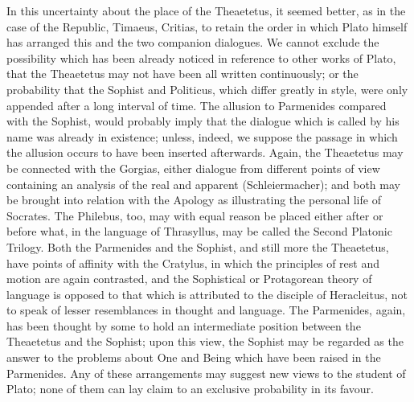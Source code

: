 \documentclass[11pt,letter]{article}
\begin{document}
\par  In this uncertainty about the place of the Theaetetus, it seemed better, as in the case of the Republic, Timaeus, Critias, to retain the order in which Plato himself has arranged this and the two companion dialogues. We cannot exclude the possibility which has been already noticed in reference to other works of Plato, that the Theaetetus may not have been all written continuously; or the probability that the Sophist and Politicus, which differ greatly in style, were only appended after a long interval of time. The allusion to Parmenides compared with the Sophist, would probably imply that the dialogue which is called by his name was already in existence; unless, indeed, we suppose the passage in which the allusion occurs to have been inserted afterwards. Again, the Theaetetus may be connected with the Gorgias, either dialogue from different points of view containing an analysis of the real and apparent (Schleiermacher); and both may be brought into relation with the Apology as illustrating the personal life of Socrates. The Philebus, too, may with equal reason be placed either after or before what, in the language of Thrasyllus, may be called the Second Platonic Trilogy. Both the Parmenides and the Sophist, and still more the Theaetetus, have points of affinity with the Cratylus, in which the principles of rest and motion are again contrasted, and the Sophistical or Protagorean theory of language is opposed to that which is attributed to the disciple of Heracleitus, not to speak of lesser resemblances in thought and language. The Parmenides, again, has been thought by some to hold an intermediate position between the Theaetetus and the Sophist; upon this view, the Sophist may be regarded as the answer to the problems about One and Being which have been raised in the Parmenides. Any of these arrangements may suggest new views to the student of Plato; none of them can lay claim to an exclusive probability in its favour.
\end{document}
